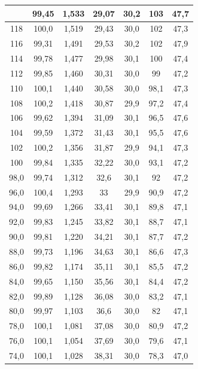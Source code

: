 \documentclass[a4paper]{article}
\begin{document}
\begin{longtable}{|c|c|c|c|c|c|c|}
\hline \hline
\endlastfoot
    \hline
        120 & 99,45 & 1,533 & 29,07 & 30,2 & 103 & 47,7 \\ \hline
        118 & 100,0 & 1,519 & 29,43 & 30,0 & 102 & 47,3 \\ \hline
        116 & 99,31 & 1,491 & 29,53 & 30,2 & 102 & 47,9 \\ \hline
        114 & 99,78 & 1,477 & 29,98 & 30,1 & 100 & 47,4 \\ \hline
        112 & 99,85 & 1,460 & 30,31 & 30,0 & 99 & 47,2 \\ \hline
        110 & 100,1 & 1,440 & 30,58 & 30,0 & 98,1 & 47,3 \\ \hline
        108 & 100,2 & 1,418 & 30,87 & 29,9 & 97,2 & 47,4 \\ \hline
        106 & 99,62 & 1,394 & 31,09 & 30,1 & 96,5 & 47,6 \\ \hline
        104 & 99,59 & 1,372 & 31,43 & 30,1 & 95,5 & 47,6 \\ \hline
        102 & 100,2 & 1,356 & 31,87 & 29,9 & 94,1 & 47,3 \\ \hline
        100 & 99,84 & 1,335 & 32,22 & 30,0 & 93,1 & 47,2 \\ \hline
        98,0 & 99,74 & 1,312 & 32,6 & 30,1 & 92 & 47,2 \\ \hline
        96,0 & 100,4 & 1,293 & 33 & 29,9 & 90,9 & 47,2 \\ \hline
        94,0 & 99,69 & 1,266 & 33,41 & 30,1 & 89,8 & 47,1 \\ \hline
        92,0 & 99,83 & 1,245 & 33,82 & 30,1 & 88,7 & 47,1 \\ \hline
        90,0 & 99,81 & 1,220 & 34,21 & 30,1 & 87,7 & 47,2 \\ \hline
        88,0 & 99,73 & 1,196 & 34,63 & 30,1 & 86,6 & 47,3 \\ \hline
        86,0 & 99,82 & 1,174 & 35,11 & 30,1 & 85,5 & 47,2 \\ \hline
        84,0 & 99,65 & 1,150 & 35,56 & 30,1 & 84,4 & 47,2 \\ \hline
        82,0 & 99,89 & 1,128 & 36,08 & 30,0 & 83,2 & 47,1 \\ \hline
        80,0 & 99,97 & 1,103 & 36,6  & 30,0 & 82 & 47,1 \\ \hline
        78,0 & 100,1 & 1,081 & 37,08 & 30,0 & 80,9 & 47,2 \\ \hline
        76,0 & 100,1 & 1,054 & 37,69 & 30,0 & 79,6 & 47,1 \\ \hline
        74,0 & 100,1 & 1,028 & 38,31 & 30,0 & 78,3 & 47,0 \\ \hline

\end{longtable}
\end{document}
